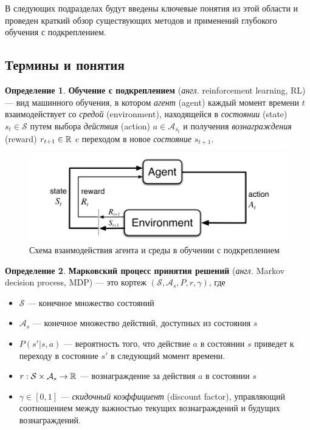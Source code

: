 \documentclass[specification,annotation,times]{itmo-student-thesis}
\theoremstyle{definition}
\newtheorem{definition-ru}{Определение}
\begin{document}
В следующих подразделах будут введены ключевые понятия из этой области и
проведен краткий обзор существующих методов и применений глубокого обучения с
подкреплением.

\subsection{Термины и понятия}

\begin{definition-ru}
  \textbf{Обучение с подкреплением} (\textit{англ.} reinforcement learning, RL) --- вид машинного
  обучения, в котором \textit{агент} (agent) каждый момент времени $t$ 
  взаимодействует со \textit{средой} (environment), находящейся в
  \textit{состоянии} (state) $s_t \in \mathcal{S}$ путем выбора
  \textit{действия} (action) $a \in \mathcal{A}_{s_t}$ и получения
  \textit{вознаграждения} (reward) $r_{t+1} \in \Bbb{R}$ c переходом в новое
  \textit{состояние} $s_{t+1}$.
\end{definition-ru}

\begin{figure}[!h]
  \caption{Схема взаимодействия агента и среды в обучении с подкреплением}\label{rl-scheme}
  \centering
  \includegraphics[scale=0.5]{rl-scheme}
\end{figure}

\begin{definition-ru}
  \textbf{Марковский процесс принятия решений} (\textit{англ.} Markov decision process, MDP) ---
  это кортеж
  $(\mathcal{S}, \mathcal{A}_s, P, r, \gamma)$, где

  \begin{itemize}
  \item $\mathcal{S}$ --- конечное множество состояний
  \item $\mathcal{A}_s$ --- конечное множество действий, доступных из состояния
    $s$
  \item $P(s' | s, a)$ --- вероятность того, что действие $a$ в состоянии $s$
    приведет к переходу в состояние $s'$ в следующий момент времени.
  \item $r : \mathcal{S} \times \mathcal{A}_s \rightarrow \Bbb{R}$ ---
    вознаграждение за действия $a$ в состоянии $s$
  \item $\gamma \in [0, 1]$ --- \textit{скидочный коэффициент} (discount factor),
    управляющий соотношением между важностью текущих вознаграждений и будущих вознаграждений.
  \end{itemize}
\end{definition-ru}
\end{document}
